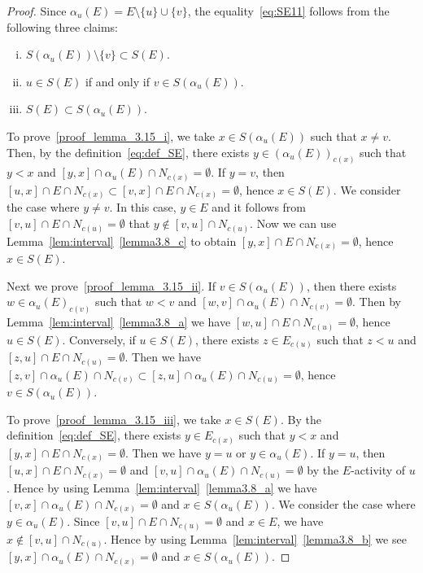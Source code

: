 \begin{proof}
Since $\alpha_u(E) = E \setminus \{ u \} \cup \{ v \}$, the equality~\eqref{eq:SE11} 
follows from the following three claims:
\begin{enumerate}[(i)]
\item\label{proof_lemma_3.15_i} %
$S(\alpha_u(E)) \setminus \{ v \} \subset S(E)$.
\item\label{proof_lemma_3.15_ii} %
$u \in S(E)$ if and only if $v \in S(\alpha_u(E))$.
\item\label{proof_lemma_3.15_iii} %
$S(E) \subset S(\alpha_u(E))$.
\end{enumerate}

To prove~\ref{proof_lemma_3.15_i}, we take $x \in S(\alpha_u(E))$ such that $x \neq v$.
Then, by the definition~\eqref{eq:def_SE}, there exists $y \in (\alpha_u(E))_{c(x)}$ such that $y<x$ 
and $[y,x] \cap \alpha_u(E) \cap N_{c(x)} = \emptyset$.
If $y = v$, then $[u,x] \cap E \cap N_{c(x)} \subset [v,x] \cap E \cap N_{c(x)} = \emptyset$, 
hence $x \in S(E)$.
We consider the case where $y \neq v$.
In this case, $y \in E$ and it follows from $[v,u] \cap E \cap N_{c(u)} = \emptyset$ 
that $y \not\in [v,u] \cap N_{c(u)}$.
Now we can use Lemma~\ref{lem:interval}~\ref{lemma3.8_c} to obtain $[y,x] \cap E \cap N_{c(x)} = \emptyset$, 
hence $x \in S(E)$.

Next we prove~\ref{proof_lemma_3.15_ii}.
If $v\in S(\alpha_u(E))$, then there exists $w \in \alpha_u(E)_{c(v)}$ such that 
$w<v$ and $[w,v] \cap \alpha_u(E) \cap N_{c(v)} = \emptyset$.
Then by Lemma~\ref{lem:interval}~\ref{lemma3.8_a} we have $[w,u] \cap E \cap N_{c(u)} = \emptyset$, 
hence $u \in S(E)$.
Conversely, 
if $u \in S(E)$, there exists $z \in E_{c(u)}$ such that $z < u$ and $[z,u] \cap E \cap N_{c(u)} = \emptyset$.
Then we have $[z,v] \cap \alpha_u(E) \cap N_{c(v)} \subset [z,u] \cap \alpha_u(E) \cap N_{c(u)} = \emptyset$, 
hence $v \in S(\alpha_u(E))$.

To prove~\ref{proof_lemma_3.15_iii}, we take $x \in S(E)$.
By the definition~\eqref{eq:def_SE}, 
there exists $y \in E_{c(x)}$ such that $y<x$ and $[y,x] \cap E \cap N_{c(x)} = \emptyset$.
Then we have $y = u$ or $y \in \alpha_u(E)$.
If $y=u$, then $[u,x] \cap E \cap N_{c(x)} = \emptyset$ and 
$[v,u] \cap \alpha_u(E) \cap N_{c(u)} = \emptyset$ by the $E$-activity of $u$.
Hence by using Lemma~\ref{lem:interval}~\ref{lemma3.8_a} we have $[v,x] \cap \alpha_u(E) \cap N_{c(x)} = \emptyset$ 
and $x \in S(\alpha_u(E))$.
We consider the case where $y \in \alpha_u(E)$.
Since $[v,u] \cap E \cap N_{c(u)} = \emptyset$ and $x \in E$, we have $x \not\in [v,u] \cap N_{c(u)}$.
Hence by using Lemma~\ref{lem:interval}~\ref{lemma3.8_b} we see $[y,x] \cap \alpha_u(E) \cap N_{c(x)} = \emptyset$ 
and $x \in S(\alpha_u(E))$.


\end{proof}
